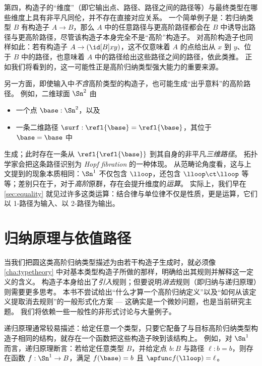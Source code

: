 %
第四，构造子的“维度”（即它输出点、路径、路径之间的路径等）与最终类型在哪些维度上具有非平凡同伦，并不存在直接对应关系。
一个简单例子是：若归纳类型 $B$ 有构造子 $A\to B$，那么 $A$ 中的任意路径与更高阶路径都会在 $B$ 中诱导出路径与更高阶路径，尽管该构造子本身完全不是“高阶”构造子。
对高阶构造子也同样如此：若有构造子 $A\to (\id[B]xy)$，这不仅意味着 $A$ 的点给出从 $x$ 到 $y$、位于 $B$ 中的路径，也意味着 $A$ 中的路径给出这些路径之间的路径，依此类推。
正如我们将看到的，这一可能性正是高阶归纳类型强大能力的重要来源。

另一方面，即使输入中\emph{不含}高阶类型的构造子，也可能生成“出乎意料”的高阶路径。
例如，二维球面 $\Sn^2$ 由
%
\begin{itemize}
\item 一个点 $\base:\Sn^2$，以及
\item 一条二维路径 $\surf:\refl{\base} = \refl{\base}$，其位于 ${\base=\base}$ 中
\end{itemize}
生成；此时存在一条从 $\refl{\refl{\base}}$ 到其自身的非平凡\emph{三维路径}。
拓扑学家会把这条路径识别为 \emph{Hopf fibration} 的一种体现。
从范畴论角度看，这与上文提到的现象本质相同：$\Sn^1$ 不仅包含 $\lloop$，还包含 $\lloop\ct\lloop$ 等等；差别只在于，对于\emph{高阶}原群，存在会提升维度的\emph{运算}。
实际上，我们早在 \cref{sec:equality} 就见过许多这类运算：结合律与单位律不仅是性质，更是运算，它们以 1-路径为输入、以 2-路径为输出。

%

\vspace*{0pt plus 20ex}
\section{归纳原理与依值路径}
\label{sec:dependent-paths}

当我们把圆这类高阶归纳类型描述为由若干构造子生成时，就必须像 \cref{cha:typetheory} 中对基本类型构造子所做的那样，明确给出其规则并解释这一定义的含义。
构造子本身给出了\emph{引入}规则；但要说明\emph{消去}规则（即归纳与递归原理）则需要更多思考。
本书不尝试给出“什么才算一个高阶归纳定义”以及“如何从该定义提取消去规则”的一般形式化方案 --- 这确实是一个微妙问题，也是当前研究主题。
我们将依赖一些一般性的非形式讨论与大量例子。

%
%
递归原理通常较易描述：给定任意一个类型，只要它配备了与目标高阶归纳类型构造子相同的结构，就存在一个函数把这些构造子映到该结构上。
例如，对 $\Sn^1$ 而言，递归原理断言：若给定任意类型 $B$，并给定点 $b:B$ 与路径 $\ell:b=b$，则存在函数 $f:\Sn^1\to B$，满足 $f(\base)=b$ 且 $\apfunc f (\lloop) = \ell$。

